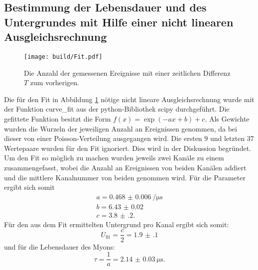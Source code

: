 \subsection{Bestimmung der Lebensdauer und des Untergrundes mit Hilfe einer nicht linearen Ausgleichsrechnung}
\label{subsec:Ausgleichs}
\begin{figure}
	\centering
	\texttt{[image: build/Fit.pdf]}
	\caption{Die Anzahl der gemessenen Ereignisse mit einer zeitlichen Differenz $T$ zum vorherigen.}
	\label{fig:zweite}
\end{figure}
Die für den Fit in Abbildung \ref{fig:zweite} nötige nicht lineare Ausgleichsrechnung wurde mit der Funktion curve\_fit aus der python-Bibliothek scipy \cite{scipy} durchgeführt. Die gefittete Funktion besitzt die Form $f(x)=\exp(-a x +b)+c$. Als Gewichte wurden die Wurzeln der jeweiligen Anzahl an Ereignissen genommen, da bei dieser von einer Poisson-Verteilung ausgegangen wird. Die ersten $9$ und letzten $37$ Wertepaare wurden für den Fit ignoriert. Dies wird in der Diskussion begründet. Um den Fit so möglich zu machen wurden jeweils zwei Kanäle zu einem zusammengefasst, wobei die Anzahl an Ereignissen von beiden Kanälen addiert und die mittlere Kanalnummer von beiden genommen wird. %
Für die Parameter ergibt sich somit
\begin{gather*}
a=\SI{0.468(6)}{\per\micro\second}\\
b=\num{6.43(2)}\\
c=\num{3.8(2)}.
\end{gather*}
Für den aus dem Fit ermittelten Untergrund pro Kanal ergibt sich somit:
\begin{displaymath}
	U_\text{fit}=\frac{c}{2}=\num{1.9(1)}
\end{displaymath}
und für die Lebensdauer des Myons:
\begin{displaymath}
	\tau=\frac{1}{a}=\SI{2.14(3)}{\micro\second}.
\end{displaymath}